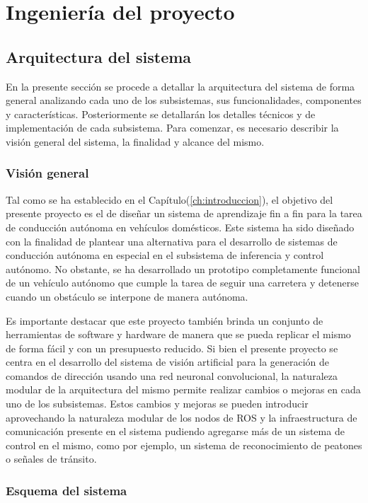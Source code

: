 \chapter{Ingeniería del proyecto}\label{ch:ingenieria}
\section{Arquitectura del sistema}
En la presente sección se procede a detallar la arquitectura del sistema de forma general analizando cada uno de 
los subsistemas, sus funcionalidades, componentes y características. Posteriormente se detallarán los detalles técnicos
y de implementación de cada subsistema. Para comenzar, es necesario describir la visión general del sistema, la finalidad 
y alcance del mismo.

    \subsection{Visión general}
    Tal como se ha establecido en el Capítulo(\ref{ch:introduccion}), el objetivo del presente proyecto es el de diseñar 
    un sistema de aprendizaje fin a fin para la tarea de conducción autónoma en vehículos domésticos. Este sistema ha sido 
    diseñado con la finalidad de plantear una alternativa para el desarrollo de sistemas de conducción autónoma en especial 
    en el subsistema de inferencia y control autónomo. No obstante, se ha desarrollado un prototipo completamente funcional 
    de un vehículo autónomo que cumple la tarea de seguir una carretera y detenerse cuando un obstáculo se interpone de 
    manera autónoma. 

    Es importante destacar que este proyecto también brinda un conjunto de herramientas de software 
    y hardware de manera que se pueda replicar el mismo de forma fácil y con un presupuesto reducido. Si bien el 
    presente proyecto se centra en el desarrollo 
    del sistema de visión artificial para la generación de comandos de dirección usando una red neuronal convolucional, la 
    naturaleza modular de la arquitectura del mismo permite realizar cambios o mejoras en cada uno de los subsistemas. Estos 
    cambios y mejoras se pueden introducir aprovechando la naturaleza modular de los nodos de ROS y la infraestructura de 
    comunicación presente en el sistema pudiendo agregarse más de un sistema de control en el mismo, como por ejemplo, un 
    sistema de reconocimiento de peatones o señales de tránsito.

    \subsection{Esquema del sistema}

